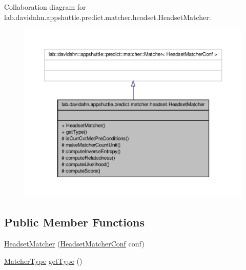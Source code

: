 \-Collaboration diagram for lab.\-davidahn.\-appshuttle.\-predict.\-matcher.\-headset.\-Headset\-Matcher\-:
\nopagebreak
\begin{figure}[H]
\begin{center}
\leavevmode
\includegraphics[width=350pt]{classlab_1_1davidahn_1_1appshuttle_1_1predict_1_1matcher_1_1headset_1_1_headset_matcher__coll__graph}
\end{center}
\end{figure}
\subsection*{\-Public \-Member \-Functions}
\begin{DoxyCompactItemize}
\item 
\hyperlink{classlab_1_1davidahn_1_1appshuttle_1_1predict_1_1matcher_1_1headset_1_1_headset_matcher_a4860b5c3fe738add8413c82ed90c4324}{\-Headset\-Matcher} (\hyperlink{classlab_1_1davidahn_1_1appshuttle_1_1predict_1_1matcher_1_1headset_1_1_headset_matcher_conf}{\-Headset\-Matcher\-Conf} conf)
\item 
\hyperlink{enumlab_1_1davidahn_1_1appshuttle_1_1predict_1_1matcher_1_1_matcher_type}{\-Matcher\-Type} \hyperlink{classlab_1_1davidahn_1_1appshuttle_1_1predict_1_1matcher_1_1headset_1_1_headset_matcher_abe7c9537c80655c1dd40e1a5881116a2}{get\-Type} ()
\end{DoxyCompactItemize}
